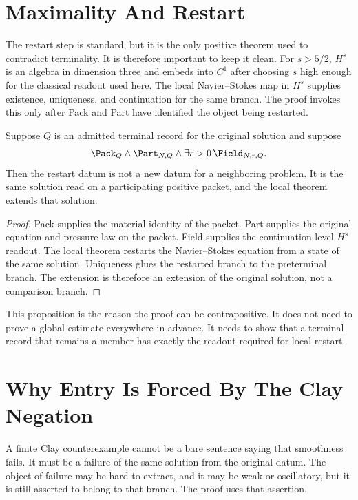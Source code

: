 \section{Maximality And Restart}

The restart step is standard, but it is the only positive theorem used to contradict terminality.
It is therefore important to keep it clean.
For \(s>5/2\), \(H^s\) is an algebra in dimension three and embeds into \(C^1\) after choosing \(s\) high enough for the classical readout used here.
The local Navier--Stokes map in \(H^s\) supplies existence, uniqueness, and continuation for the same branch.
The proof invokes this only after Pack and Part have identified the object being restarted.

\begin{proposition}
Suppose \(Q\) is an admitted terminal record for the original solution and suppose
\[
  \Pack_Q\wedge\Part_{N,Q}\wedge\exists r>0\,\Field_{N,r,Q}.
\]
Then the restart datum is not a new datum for a neighboring problem.
It is the same solution read on a participating positive packet, and the local theorem extends that solution.
\end{proposition}

\begin{proof}
Pack supplies the material identity of the packet.
Part supplies the original equation and pressure law on the packet.
Field supplies the continuation-level \(H^s\) readout.
The local theorem restarts the Navier--Stokes equation from a state of the same solution.
Uniqueness glues the restarted branch to the preterminal branch.
The extension is therefore an extension of the original solution, not a comparison branch.
\end{proof}

This proposition is the reason the proof can be contrapositive.
It does not need to prove a global estimate everywhere in advance.
It needs to show that a terminal record that remains a member has exactly the readout required for local restart.

\section{Why Entry Is Forced By The Clay Negation}

A finite Clay counterexample cannot be a bare sentence saying that smoothness fails.
It must be a failure of the same solution from the original datum.
The object of failure may be hard to extract, and it may be weak or oscillatory, but it is still asserted to belong to that branch.
The proof uses that assertion.

